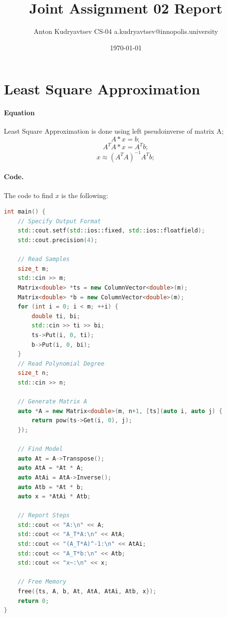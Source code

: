 \documentclass{article}
\title{Joint Assignment 02 Report}
\author{Anton Kudryavtsev CS-04 a.kudryavtsev@innopolis.university}
\date{\today}
\begin{document}
\maketitle
\section*{Least Square Approximation}
\paragraph*{Equation} Least Square Approximation is done using left pseudoinverse of matrix A;
\begin{equation}
    A * x = b;
\end{equation}
\begin{equation}
    A^TA * x = A^Tb;
\end{equation}
\begin{equation}
    x \approx  (A^TA)^{-1}A^Tb;
\end{equation}
\paragraph{Code.} The code to find $x$ is the following:
\begin{lstlisting}[language=c++]
int main() {
    // Specify Output Format
    std::cout.setf(std::ios::fixed, std::ios::floatfield);
    std::cout.precision(4);

    // Read Samples
    size_t m;
    std::cin >> m;
    Matrix<double> *ts = new ColumnVector<double>(m);
    Matrix<double> *b = new ColumnVector<double>(m);
    for (int i = 0; i < m; ++i) {
        double ti, bi;
        std::cin >> ti >> bi;
        ts->Put(i, 0, ti);
        b->Put(i, 0, bi);
    }
    // Read Polynomial Degree
    size_t n;
    std::cin >> n;

    // Generate Matrix A
    auto *A = new Matrix<double>(m, n+1, [ts](auto i, auto j) {
        return pow(ts->Get(i, 0), j);
    });

    // Find Model
    auto At = A->Transpose();
    auto AtA = *At * A;
    auto AtAi = AtA->Inverse();
    auto Atb = *At * b;
    auto x = *AtAi * Atb;

    // Report Steps
    std::cout << "A:\n" << A;
    std::cout << "A_T*A:\n" << AtA;
    std::cout << "(A_T*A)^-1:\n" << AtAi;
    std::cout << "A_T*b:\n" << Atb;
    std::cout << "x~:\n" << x;

    // Free Memory
    free({ts, A, b, At, AtA, AtAi, Atb, x});
    return 0;
}
\end{lstlisting}
\end{document}
